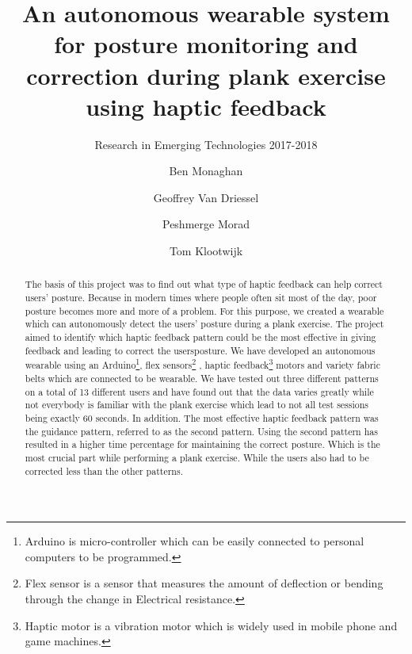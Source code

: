 \documentclass[sigconf]{acmart}
\begin{document}
\title{An autonomous wearable system for posture monitoring and correction during plank exercise using haptic feedback}
\subtitle{Research in Emerging Technologies 2017-2018 }


\author{Ben Monaghan}


\author{Geoffrey Van Driessel}

\author{Peshmerge Morad}

\author{Tom Klootwijk}

\begin{abstract}
The basis of this project was to find out what type of haptic feedback can help correct users' posture. Because in modern times where people often sit most of the day, poor posture becomes more and more of a problem. For this purpose, we created a wearable which can autonomously detect the users' posture during a plank exercise. The project aimed to identify which haptic feedback pattern could be the most effective in giving feedback and leading to correct the users\textquotesingle  posture. We have developed an autonomous wearable using an Arduino\footnote{Arduino is micro-controller which can be easily connected to personal computers to be programmed.}, flex sensors\footnote{Flex sensor is a sensor that measures the amount of deflection or bending through the change in Electrical resistance.} , haptic feedback\footnote{Haptic motor is a vibration motor which is widely used in mobile phone and game machines.} motors  and variety fabric belts which are connected to be wearable. We have tested out three different patterns on a total of 13 different users and have found out that the data varies greatly while not everybody is familiar with the plank exercise which lead to not all test sessions being exactly 60 seconds. In addition. The most effective haptic feedback pattern was the guidance pattern, referred to as the second pattern. Using the second pattern has resulted in a higher time percentage for maintaining the correct posture. Which is the most crucial part while performing a plank exercise. While the users also had to be corrected less than the other patterns.
\end{abstract}
\end{document}
